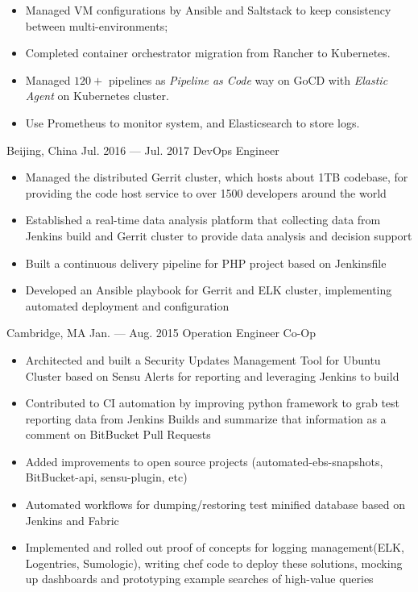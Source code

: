 \documentclass{resume}
\begin{document}
\begin{body}
\begin{itemize}
\begin{itemize}[noitemsep,topsep=0pt]
			\item Managed VM configurations by Ansible and Saltstack to keep consistency between multi-environments;
			\item Completed container orchestrator migration from Rancher to Kubernetes.
			\item Managed $120+$ pipelines as \textit{Pipeline as Code} way on GoCD with \textit{Elastic Agent} on Kubernetes cluster.
			\item Use Prometheus to monitor system, and Elasticsearch to store logs.
		\end{itemize}
	\end{itemize}
\end{body}

\begin{body}
	{Beijing, China}
	{Jul. 2016 --- Jul. 2017}
	{DevOps Engineer}
	\begin{itemize}[noitemsep,topsep=0pt]
		\item Managed the distributed Gerrit cluster, which hosts about 1TB codebase, for providing the code host service to over 1500 developers around the world
		\item Established a real-time data analysis platform that collecting data from Jenkins build and Gerrit cluster to provide data analysis and decision support
		\item Built a continuous delivery pipeline for PHP project based on Jenkinsfile
		\item Developed an Ansible playbook for Gerrit and ELK cluster, implementing automated deployment and configuration
	\end{itemize}
\end{body}

\begin{body}
	{Cambridge, MA}
	{Jan. --- Aug. 2015}
	{Operation Engineer Co-Op}
	\begin{itemize}[noitemsep,topsep=0pt]
		\item Architected and built a Security Updates Management Tool for Ubuntu Cluster based on Sensu Alerts for reporting and leveraging Jenkins to build
		\item Contributed to CI automation by improving python framework to grab test reporting data from Jenkins Builds and summarize that information as a comment on BitBucket Pull Requests
		\item Added improvements to open source projects (automated-ebs-snapshots, BitBucket-api, sensu-plugin, etc)
		\item Automated workflows for dumping/restoring test minified database based on Jenkins and Fabric
		\item Implemented and rolled out proof of concepts for logging management(ELK, Logentries, Sumologic), writing chef code to deploy these solutions, mocking up dashboards and prototyping example searches of high-value queries
	\end{itemize}
\end{body}
\end{document}
